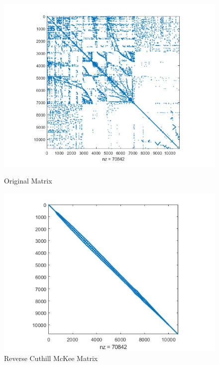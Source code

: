 \documentclass[unicode,11pt,a4paper,oneside,numbers=endperiod,openany]{scrartcl}
\begin{document}
\begin{figure}[H]
    \centering
    \begin{minipage}[b]{0.45\textwidth}
        \centering
        \includegraphics[width=\textwidth]{images/exc5.jpg}
        \caption{Original Matrix}
    \end{minipage}
    \hfill
    \begin{minipage}[b]{0.45\textwidth}
        \centering
        \includegraphics[width=\textwidth]{images/exc5n.jpg}
        \caption{Reverse Cuthill McKee Matrix}
    \end{minipage}
\end{figure}
\end{document}
